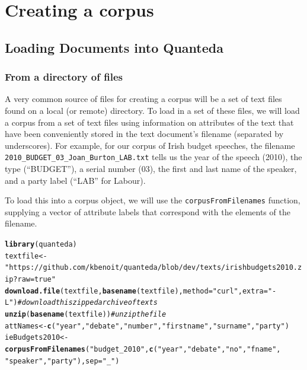 \documentclass[11pt]{article}\usepackage[]{graphicx}\usepackage[]{color}
\makeatletter
\newcommand{\hlstr}[1]{\textcolor[rgb]{0.192,0.494,0.8}{#1}}%
\newcommand{\hlcom}[1]{\textcolor[rgb]{0.678,0.584,0.686}{\textit{#1}}}%
\newcommand{\hlstd}[1]{\textcolor[rgb]{0.345,0.345,0.345}{#1}}%
\newcommand{\hlkwb}[1]{\textcolor[rgb]{0.69,0.353,0.396}{#1}}%
\newcommand{\hlkwc}[1]{\textcolor[rgb]{0.333,0.667,0.333}{#1}}%
\newcommand{\hlkwd}[1]{\textcolor[rgb]{0.737,0.353,0.396}{\textbf{#1}}}%
\newenvironment{kframe}{%
 \def\at@end@of@kframe{}%
 \ifinner\ifhmode%
  \def\at@end@of@kframe{\end{minipage}}%
  \begin{minipage}{\columnwidth}%
 \fi\fi%
 \def\FrameCommand##1{\hskip\@totalleftmargin \hskip-\fboxsep
 \colorbox{shadecolor}{##1}\hskip-\fboxsep
     \hskip-\linewidth \hskip-\@totalleftmargin \hskip\columnwidth}%
 \MakeFramed {\advance\hsize-\width
   \@totalleftmargin\z@ \linewidth\hsize
   \@setminipage}}%
 {\par\unskip\endMakeFramed%
 \at@end@of@kframe}
\newenvironment{knitrout}{}{} %
\makeatother
\begin{document}
\section{Creating a corpus}

\subsection{Loading Documents into Quanteda}

\subsubsection{From a directory of files}

A very common source of files for creating a corpus will be a set of
text files found on a local (or remote) directory.  To load in a set
of these files, we will load a corpus from a set of text files using
information on attributes of the text that have been conveniently
stored in the text document's filename (separated by underscores).
For example, for our corpus of Irish budget speeches, the filename
\texttt{2010\_BUDGET\_03\_Joan\_Burton\_LAB.txt} tells us the year of
the speech (2010), the type (``BUDGET''), a serial number (03), the
first and last name of the speaker, and a party label (``LAB'' for
Labour).

To load this into a corpus object, we will use the
\texttt{corpusFromFilenames} function, supplying a vector of attribute
labels that correspond with the elements of the filename.

\begin{knitrout}
\color{fgcolor}\begin{kframe}
\begin{alltt}
\hlkwd{library}\hlstd{(quanteda)}
\hlstd{textfile} \hlkwb{<-} \hlstr{"https://github.com/kbenoit/quanteda/blob/dev/texts/irishbudgets2010.zip?raw=true"}
\hlkwd{download.file}\hlstd{(textfile,} \hlkwd{basename}\hlstd{(textfile),} \hlkwc{method} \hlstd{=} \hlstr{"curl"}\hlstd{,} \hlkwc{extra} \hlstd{=} \hlstr{"-L"}\hlstd{)}  \hlcom{# download this zipped archive of texts}
\hlkwd{unzip}\hlstd{(}\hlkwd{basename}\hlstd{(textfile))}  \hlcom{# unzip the file}
\hlstd{attNames} \hlkwb{<-} \hlkwd{c}\hlstd{(}\hlstr{"year"}\hlstd{,} \hlstr{"debate"}\hlstd{,} \hlstr{"number"}\hlstd{,} \hlstr{"firstname"}\hlstd{,} \hlstr{"surname"}\hlstd{,} \hlstr{"party"}\hlstd{)}
\hlstd{ieBudgets2010} \hlkwb{<-} \hlkwd{corpusFromFilenames}\hlstd{(}\hlstr{"budget_2010"}\hlstd{,} \hlkwd{c}\hlstd{(}\hlstr{"year"}\hlstd{,} \hlstr{"debate"}\hlstd{,} \hlstr{"no"}\hlstd{,} \hlstr{"fname"}\hlstd{,}
    \hlstr{"speaker"}\hlstd{,} \hlstr{"party"}\hlstd{),} \hlkwc{sep} \hlstd{=} \hlstr{"_"}\hlstd{)}
\end{alltt}
\end{kframe}
\end{knitrout}
\end{document}
